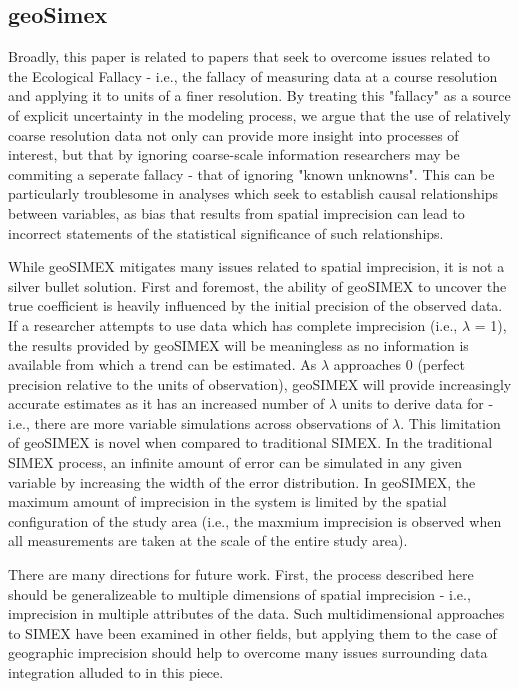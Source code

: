 \subsection{geoSimex}
Broadly, this paper is related to papers that seek to overcome issues related to the Ecological Fallacy - i.e., the fallacy of measuring data at a course resolution and applying it to units of a finer resolution.
By treating this "fallacy" as a source of explicit uncertainty in the modeling process, we argue that the use of relatively coarse resolution data not only can provide more insight into processes of interest, but that by ignoring coarse-scale information researchers may be commiting a seperate fallacy - that of ignoring "known unknowns".
This can be particularly troublesome in analyses which seek to establish causal relationships between variables, as bias that results from spatial imprecision can lead to incorrect statements of the statistical significance of such relationships.
\par
While geoSIMEX mitigates many issues related to spatial imprecision, it is not a silver bullet solution.
First and foremost, the ability of geoSIMEX to uncover the true coefficient is heavily influenced by the initial precision of the observed data.
If a researcher attempts to use data which has complete imprecision (i.e., $\lambda$ = 1), the results provided by geoSIMEX will be meaningless as no information is available from which a trend can be estimated.
As $\lambda$ approaches 0 (perfect precision relative to the units of observation), geoSIMEX will provide increasingly accurate estimates as it has an increased number of $\lambda$ units to derive data for - i.e., there are more variable simulations across observations of $\lambda$.
This limitation of geoSIMEX is novel when compared to traditional SIMEX.
In the traditional SIMEX process, an infinite amount of error can be simulated in any given variable by increasing the width of the error distribution.
In geoSIMEX, the maximum amount of imprecision in the system is limited by the spatial configuration of the study area (i.e., the maxmium imprecision is observed when all measurements are taken at the scale of the entire study area).
\par
There are many directions for future work.
First, the process described here should be generalizeable to multiple dimensions of spatial imprecision - i.e., imprecision in multiple attributes of the data.
Such multidimensional approaches to SIMEX have been examined in other fields, but applying them to the case of geographic imprecision should help to overcome many issues surrounding data integration alluded to in this piece.
